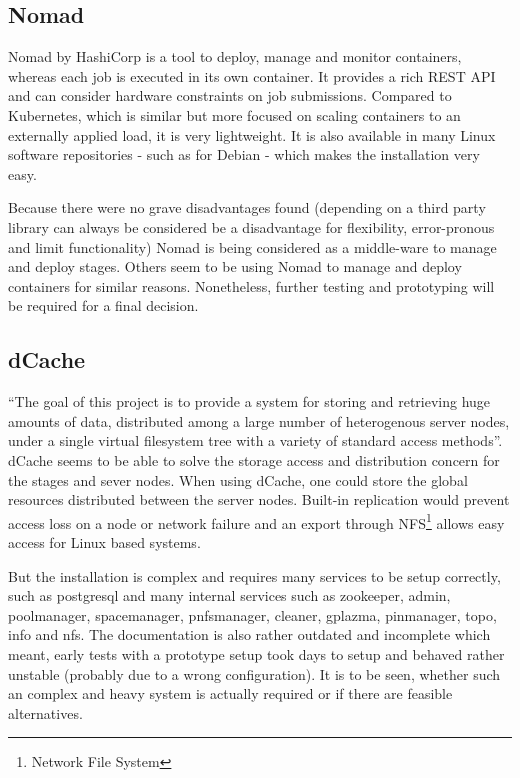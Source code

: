\subsection{Nomad}
\label{nomad}

Nomad\cite{nomad:main} by HashiCorp is a tool to deploy, manage and monitor containers, whereas each job is executed in its own container.
It provides a rich REST API and can consider hardware constraints on job submissions.
Compared to Kubernetes\cite{nomad:vs:kubernetes}, which is similar but more focused on scaling containers to an externally applied load, it is very lightweight.
It is also available in many Linux software repositories - such as for Debian - which makes the installation very easy.

Because there were no grave disadvantages found (depending on a third party library can always be considered be a disadvantage for flexibility, error-pronous and limit functionality) Nomad is being considered as a middle-ware to manage and deploy stages.
Others\cite{nomad:etc:gui_thesis} seem to be using Nomad to manage and deploy containers for similar reasons.
Nonetheless, further testing and prototyping will be required for a final decision.


\subsection{dCache}
\label{dcache}

\enquote{The goal of this project is to provide a system for storing and retrieving huge amounts of data, distributed among a large number of heterogenous server nodes, under a single virtual filesystem tree with a variety of standard access methods}\cite{dcache:main}.
dCache seems to be able to solve the storage access and distribution concern for the stages and sever nodes.
When using dCache, one could store the global resources distributed between the server nodes.
Built-in replication would prevent access loss on a node or network failure and an export through NFS\footnote{Network File System} allows easy access for Linux based systems\cite{dcache:overview:whitepaper}.

But the installation is complex and requires many services to be setup correctly, such as postgresql and many internal services such as zookeeper, admin, poolmanager, spacemanager, pnfsmanager, cleaner, gplazma, pinmanager, topo, info and nfs.
The documentation is also rather outdated and incomplete which meant, early tests with a prototype setup took days to setup and behaved rather unstable (probably due to a wrong configuration).
It is to be seen, whether such an complex and heavy system is actually required or if there are feasible alternatives.




